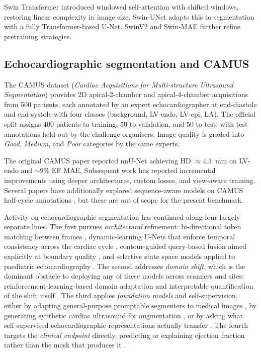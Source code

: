 Swin Transformer \citep{liu2021swin} introduced windowed self-attention
with shifted windows, restoring linear complexity in image size. Swin-UNet
\citep{cao2022} adapts this to segmentation with a fully Transformer-based
U-Net. SwinV2 \citep{liu2022swinv2} and Swin-MAE
\citep{baochen2023swinmae} further refine pretraining strategies.

\subsection{Echocardiographic segmentation and CAMUS}
\label{sec:related-camus}

The CAMUS dataset \citep{leclerc2019} (\emph{Cardiac Acquisitions for
Multi-structure Ultrasound Segmentation}) provides 2D apical-2-chamber and
apical-4-chamber acquisitions from 500 patients, each annotated by an
expert echocardiographer at end-diastole and end-systole with four
classes (background, LV-endo, LV-epi, LA). The official split assigns
$400$ patients to training, $50$ to validation, and $50$ to test, with
test annotations held out by the challenge organisers. Image quality is
graded into \emph{Good}, \emph{Medium}, and \emph{Poor} categories by
the same experts.

The original CAMUS paper reported nnU-Net achieving
HD $\approx 4.3$~mm on LV-endo and $\sim$$9\%$ EF MAE.
Subsequent work \citep{painchaud2022, smistad2021}
has reported incremental improvements using deeper architectures, custom
losses, and view-aware training. Several papers have additionally
explored sequence-aware models on CAMUS half-cycle annotations
\citep{painchaud2022}, but these are out of scope for the present
benchmark.

Activity on echocardiographic segmentation has continued along four
largely separate lines. The first pursues \emph{architectural} refinement:
bi-directional token matching between frames \citep{liu2025botm},
dynamic-learning U-Nets that enforce temporal consistency across the
cardiac cycle \citep{qu2025dylunet}, contour-guided query-based fusion
aimed explicitly at boundary quality \citep{ullah2026contour}, and
selective state space models applied to paediatric echocardiography
\citep{ye2024pmamba}. The second addresses \emph{domain shift}, which is
the dominant obstacle to deploying any of these models across scanners
and sites: reinforcement-learning-based domain adaptation
\citep{judge2024domain, judge2025rlda} and interpretable quantification of
the shift itself \citep{elyasi2026domainshift}. The third applies
\emph{foundation models} and self-supervision, either by adapting
general-purpose promptable segmenters to medical images
\citep{ma2024samed}, by generating synthetic cardiac ultrasound for
augmentation \citep{tiago2024synthetic, reynaud2025echoflow}, or by asking
what self-supervised echocardiographic representations actually transfer
\citep{majchrowska2026ssl}. The fourth targets the \emph{clinical
endpoint} directly, predicting or explaining ejection fraction rather than
the mask that produces it \citep{zhang2024lvpredict, thomas2024echonarrator,
li2025echovlm, wang2026echoagent}.

